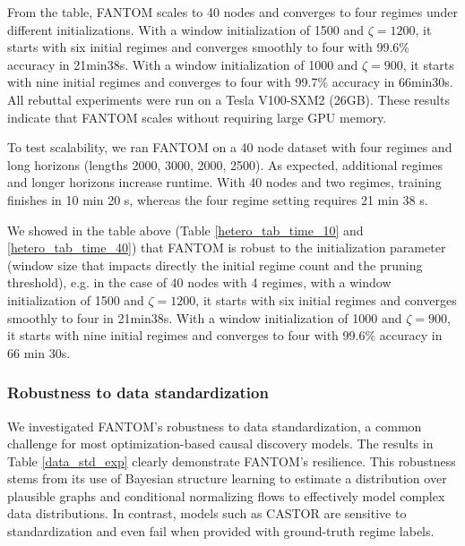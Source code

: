 From the table, FANTOM scales to 40 nodes and converges to four regimes under different initializations. With a window initialization of 1500 and $\zeta =1200$, it starts with six initial regimes and converges smoothly to four with 99.6\% accuracy in 21min38s. With a window initialization of 1000 and $\zeta = 900$, it starts with nine initial regimes and converges to four with 99.7\% accuracy in 66min30s. All rebuttal experiments were run on a Tesla V100‑SXM2 (26GB). These results indicate that FANTOM scales without requiring large GPU memory.

To test scalability, we ran FANTOM on a 40 node dataset with four regimes and long horizons (lengths 2000, 3000, 2000, 2500). As expected, additional regimes and longer horizons increase runtime. With 40 nodes and two regimes, training finishes in 10 min 20 s, whereas the four regime setting requires 21 min 38 s.

We showed in the table above (Table \ref{hetero_tab_time_10} and \ref{hetero_tab_time_40}) that FANTOM is robust to the initialization parameter (window size that impacts directly the initial regime count and the pruning threshold), e.g. in the case of 40 nodes with 4 regimes, with a window initialization of 1500 and $\zeta =1200$, it starts with six initial regimes and converges smoothly to four in 21min38s. With a window initialization of 1000 and $\zeta = 900$, it starts with nine initial regimes and converges to four with 99.6\% accuracy in 66 min 30s.
\vspace{-20pt}
\subsubsection{Robustness to data standardization}
We investigated FANTOM's robustness to data standardization, a common challenge for most optimization-based causal discovery models. The results in Table \ref{data_std_exp} clearly demonstrate FANTOM's resilience. This robustness stems from its use of Bayesian structure learning to estimate a distribution over plausible graphs and conditional normalizing flows to effectively model complex data distributions. In contrast, models such as CASTOR are sensitive to standardization and even fail when provided with ground-truth regime labels.

